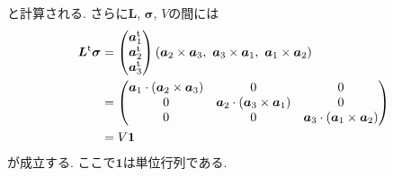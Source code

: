 と計算される. さらに$\bm{L}$, $\bm{\sigma}$, $V$の間には
\begin{align}
  \bm{L}^{\mathrm{t}} \bm{\sigma}
  &=
  \begin{pmatrix}
    \bm{a}_{1}^{\mathrm{t}} \\
    \bm{a}_{2}^{\mathrm{t}} \\
    \bm{a}_{3}^{\mathrm{t}}
  \end{pmatrix}
  \left(
    \bm{a}_{2} \times \bm{a}_{3},~
    \bm{a}_{3} \times \bm{a}_{1},~
    \bm{a}_{1} \times \bm{a}_{2}
  \right)
  \notag \\
  &=
  \begin{pmatrix}
    \bm{a}_{1} \cdot (\bm{a}_{2} \times \bm{a}_{3}) & 0 & 0 \\
    0 & \bm{a}_{2} \cdot (\bm{a}_{3} \times \bm{a}_{1}) & 0 \\
    0 & 0 & \bm{a}_{3} \cdot (\bm{a}_{1} \times \bm{a}_{2})
  \end{pmatrix}
  \notag \\
  &=
  V \bm{1}
  \label{Eq:relation-Lt-sigma-V}
\end{align}
が成立する. ここで$\bm{1}$は単位行列である.

